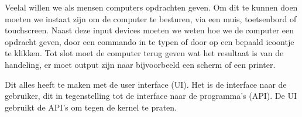 Veelal willen we als mensen computers opdrachten geven. Om dit te kunnen doen moeten we instaat zijn om de computer te besturen, via een muis, toetsenbord of touchscreen. Naast deze input devices moeten we weten hoe we de computer een opdracht geven, door een commando in te typen of door op een bepaald icoontje te klikken. Tot slot moet de computer terug geven wat het resultaat is van de handeling, er moet output zijn naar bijvoorbeeld een scherm of een printer.

Dit alles heeft te maken met de user interface (UI). Het is de interface naar de gebruiker, dit in tegenstelling tot de interface naar de programma's (API). De UI gebruikt de API's om tegen de kernel te praten.

